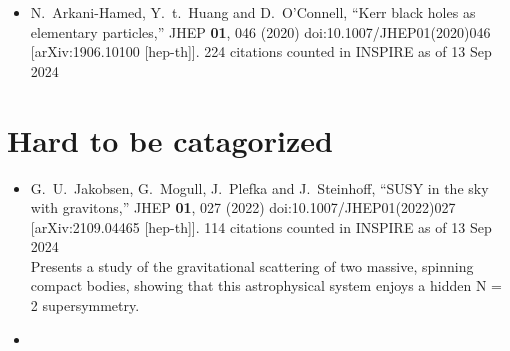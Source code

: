 \documentclass[a4paper,12pt]{article}
\title{}
\author{}
\begin{document}
    \begin{itemize}
        \item %
        N.~Arkani-Hamed, Y.~t.~Huang and D.~O'Connell,
        ``Kerr black holes as elementary particles,''
        JHEP \textbf{01}, 046 (2020)
        doi:10.1007/JHEP01(2020)046
        [arXiv:1906.10100 [hep-th]].
        224 citations counted in INSPIRE as of 13 Sep 2024
    \end{itemize}
\section*{Hard to be catagorized}
\begin{itemize}
    \item %
    G.~U.~Jakobsen, G.~Mogull, J.~Plefka and J.~Steinhoff,
    ``SUSY in the sky with gravitons,''
    JHEP \textbf{01}, 027 (2022)
    doi:10.1007/JHEP01(2022)027
    [arXiv:2109.04465 [hep-th]].
    114 citations counted in INSPIRE as of 13 Sep 2024\\
    Presents a study of the gravitational scattering of two massive, spinning compact bodies, showing that this astrophysical system enjoys a hidden N = 2 supersymmetry.
    \item 
\end{itemize}
\end{document}
